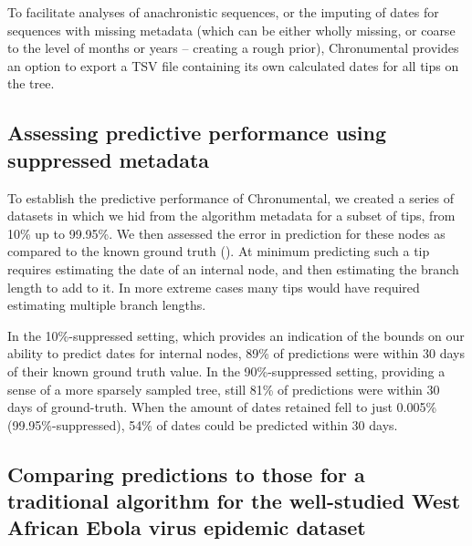 To facilitate analyses of anachronistic sequences, or the imputing of dates for sequences with missing metadata (which can be either wholly missing, or coarse to the level of months or years -- creating a rough prior), Chronumental provides an option to export a TSV file containing its own calculated dates for all tips on the tree.

\subsection*{Assessing predictive performance using suppressed metadata}

To establish the predictive performance of Chronumental, we created a series of datasets in which we hid from the algorithm metadata for a subset of tips, from 10\% up to 99.95\%. We then assessed the error in prediction for these nodes as compared to the known ground truth (). At minimum predicting such a tip requires estimating the date of an internal node, and then estimating the branch length to add to it. In more extreme cases many tips would have required estimating multiple branch lengths.

In the 10\%-suppressed setting, which provides an indication of the bounds on our ability to predict dates for internal nodes, 89\% of predictions were within 30 days of their known ground truth value. In the 90\%-suppressed setting, providing a sense of a more sparsely sampled tree, still 81\% of predictions were within 30 days of ground-truth.  When the amount of dates retained fell to just 0.005\% (99.95\%-suppressed), 54\% of dates could be predicted within 30 days.





\subsection*{Comparing predictions to those for a traditional algorithm for the well-studied West African Ebola virus epidemic dataset}

